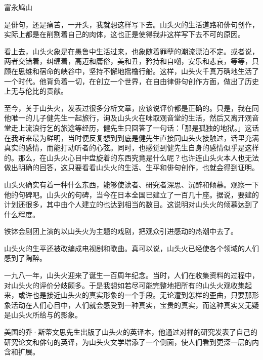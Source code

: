 {\FS

    \hfill 富永鸠山\footnotemark[1]


    \bigskip

    是俳句，还是痛苦\footnotemark[2]，一开头，我就想这样写下去。山头火的生活道路和俳句创作，实际上都是在削割着自己的肉体，这也正是使得我非这样写下去不可的原因。


    看上去，山头火象是在愚鲁中生活过来，也象随着罪孽的潮流漂泊不定。或者说，两者交错着，纠缠着，高迈和庸俗，美和丑，矜持和自嘲，安乐和悲哀，等等，只顾在思维和宿命的峡谷中，坚持不懈地摇橹行船。这样，山头火千真万确地生活了一个时代。他背负着一切，在创立一个世界，在自由律俳句创作方面，做出了历史上无与伦比的贡献。

    至今，关于山头火，发表过很多分析文章，应该说评价都是正确的。只是，我在同他唯一的儿子健先生一起旅行，询及山头火在味取观音堂的生活，然后又离开观音堂走上流浪行乞的旅途等经历，健先生只回答了一句话：「那是孤独的地狱。」这话在我听来最为鲜明，当时便反复想到到底是健先生直接同山头火接触过，话里充满真实的感情，而能打动听者的心弦。同时，也感觉到健先生自身的感情似乎是这样的。那么，在山头火心目中盘旋着的东西究竟是什么呢？也许连山头火本人也无法做出明确的回答，这只要看看山头火的生活、生平和俳句创作，也就会得到证明。

    山头火确实有着一种什么东西，能够使读者、研究者深思、沉醉和倾慕。观察一下他的句碑吧。山头火的句碑，当今在日本全国已建立了一百几十座。据说，要建的计划还很多，其中由个人建立的也达到相当的数目。这说明对山头火的倾慕达到了什么程度。

    铁钵会剧团上演的以山头火为主题的戏剧，把观众引进感动的热潮中去了。

    山头火的生平还被改编成电视剧和歌曲。真可以说，山头火已经使各个领域的人们感到了陶醉。

    一九八一年，山头火迎来了诞生一百周年纪念。当时，人们在收集资料的过程中，对山头火的评价分歧颇多。于是我想如若尽可能完整地把所有的山头火观收集起来，或许也是接近山头火的真实形象的一个手段。无论遭到怎样的歪曲，只要那形象活动在人们心目中，人们就会感受到一种真实，宝贵的真实，而这种真实又无疑是山头火所给与的影象。

    美国的乔·斯蒂文思先生出版了山头火的英译本，他通过对禅的研究发表了自己的研究论文和俳句的英译，为山头火文学增添了一个侧面，使人们看到更深一层的内含和扩展。

}
